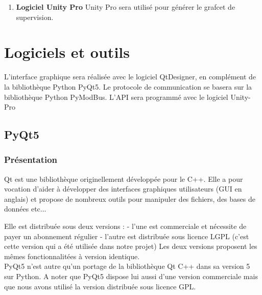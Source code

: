 {\begin{enumerate}
Il est également possible d'installer pip via Anaconda (ouvrir un terminal ou console) :
\begin{lstlisting}
conda install pip
\end{lstlisting}

\item \textbf{Logiciel Unity Pro} \newline 
Unity Pro sera utilisé pour générer le grafcet de supervision. \newline 
\end{enumerate}

\chapter{Logiciels et outils}


L'interface graphique sera réalisée avec le logiciel QtDesigner, en complément de la bibliothèque Python PyQt5.
Le protocole de communication se basera sur la bibliothèque Python PyModBus.
L'API sera programmé avec le logiciel Unity-Pro

\section{PyQt5}

\subsection{Présentation}

Qt est une bibliothèque originellement développée pour le C++. Elle a pour vocation d'aider à développer des interfaces graphiques utilisateurs (GUI en anglais) et propose de nombreux outils pour manipuler des fichiers, des bases de données etc...\newline

Elle est distribuée sous deux versions : \newline
- l'une est commerciale et nécessite de payer un abonnement régulier\newline
- l'autre est distribuée sous licence LGPL (c'est cette version qui a été utilisée dans notre projet)
Les deux versions proposent les mêmes fonctionnalitées à version identique.\\

PyQt5 n'est autre qu'un portage de la bibliothèque Qt C++ dans sa version 5 sur Python.\newline
A noter que PyQt5 dispose lui aussi d'une version commerciale mais que nous avons utilisé la version distribuée sous licence GPL.

}
